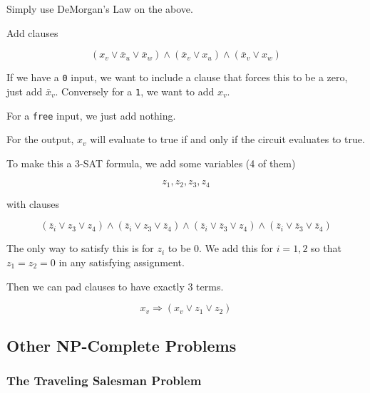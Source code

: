 \documentclass[12pt]{article}
\begin{document}
{    Simply use DeMorgan's Law on the above.

    \begin{center}
    \end{center}

    Add clauses

    \[
      (x_v \vee \bar x_u \vee \bar x_w) \wedge (\bar x_v \vee x_u) \wedge (\bar
      x_v \vee x_w)
    \]

    If we have a \texttt{0} input, we want to include a clause that forces this
    to be a zero, just add $\bar x_v$. Conversely for a \texttt{1}, we want to
    add $x_v$.

    For a \texttt{free} input, we just add nothing.

    For the output, $x_v$ will evaluate to true if and only if the circuit
    evaluates to true.

    To make this a 3-SAT formula, we add some variables (4 of them)

    \[
      z_1, z_2, z_3, z_4
    \]

    with clauses

    \[
      (\bar z_i \vee z_3 \vee z_4) \wedge (\bar z_i \vee z_3 \vee \bar
      z_4) \wedge (\bar z_i \vee \bar z_3 \vee z_4) \wedge (\bar z_i \vee \bar z_3
      \vee \bar z_4)
    \]

    The only way to satisfy this is for $z_i$ to be 0. We add this for $i = 1,
    2$ so that $z_1 = z_2 = 0$ in any satisfying assignment.

    Then we can pad clauses to have exactly 3 terms.

    \[
      x_v \Rightarrow (x_v \vee z_1 \vee z_2)
    \]
  }

  \subsection{Other NP-Complete Problems}

  \subsubsection{The Traveling Salesman Problem}
\end{document}
